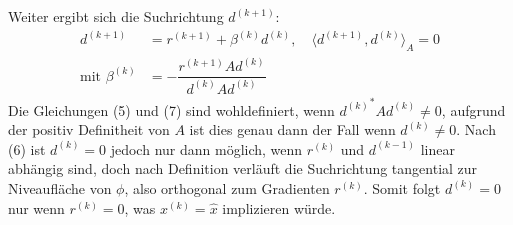 Weiter ergibt sich die Suchrichtung $d^{(k+1)}$:
\begin{align*}
    d^{(k+1)}&=r^{(k+1)} + \beta^{(k)}d^{(k)},\quad \langle d^{(k+1)}, d^{(k)}\rangle_A = 0\tag{6}\\
    \text{mit } \beta^{(k)} &= -\dfrac{r^{(k+1)}Ad^{(k)}}{d^{(k)}Ad^{(k)}} \tag{7}
\end{align*}
Die Gleichungen (5) und (7) sind wohldefiniert, wenn ${d^{(k)}}^*Ad^{(k)}\neq 0$, aufgrund der positiv Definitheit 
von $A$ ist dies genau dann der Fall wenn $d^{(k)}\neq 0$. 
Nach (6) ist $d^{(k)} = 0$ jedoch nur dann möglich, wenn $r^{(k)}$ und $d^{(k-1)}$ linear abhängig sind, 
doch nach Definition verläuft die Suchrichtung tangential zur Niveaufläche von $\phi$, 
also orthogonal zum Gradienten $r^{(k)}$.
Somit folgt $d^{(k)} = 0$ nur wenn $r^{(k)}=0$, was $x^{(k)}=\hat{x}$ implizieren würde. \\ \\
